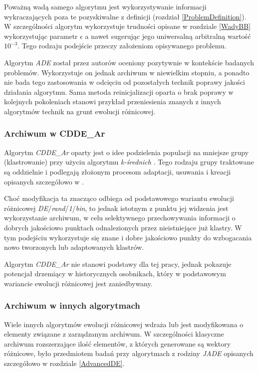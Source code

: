 \documentclass[12pt,a4paper]{report}
\begin{document}
{{{{\begin{description}
\end{description}
}
\par{
Poważną wadą samego algorytmu jest wykorzystywanie informacji wykraczających poza te pozyskiwalne z definicji (rozdział \ref{ProblemDefinition}). W szczególności algorytm wykorzystuje trudności opisane w rozdziale \ref{WadyBB} wykorzystując parametr $\epsilon$ a nawet sugerując jego uniwersalną arbitralną wartość $10^{-3}$. Tego rodzaju podejście przeczy założeniom opisywanego problemu.
}
\par{
Algorytm \emph{ADE} został przez autorów oceniony pozytywnie w kontekście badanych problemów. Wykorzystuje on jednak archiwum w niewielkim stopniu, a ponadto nie bada tego zastosowania w odcięciu od pozostałych technik poprawy jakości działania algorytmu. Sama metoda reinicjalizacji oparta o brak poprawy w kolejnych pokoleniach stanowi przykład przeniesienia znanych z innych algorytmów technik na grunt ewolucji różnicowej.
}

\subsubsection{Archiwum w CDDE{\_}Ar \cite{ClusterArchiveDE}}
\par{
Algorytm \emph{CDDE{\_}Ar} oparty jest o idee podzielenia populacji na mniejsze grupy (klastrowanie) przy użyciu algorytmu \emph{k-średnich} \cite{KMeans}. Tego rodzaju grupy traktowane są oddzielnie i podlegają złożonym procesom adaptacji, usuwania i kreacji opisanych szczegółowo w \cite{ClusterArchiveDE}.
}
\par{
Choć modyfikacja ta znacząco odbiega od podstawowego wariantu ewolucji różnicowej \emph{DE}/\emph{rand}/\emph{1}/\emph{bin}, to jednak istotnym z punktu jej widzenia jest wykorzystanie archiwum, w celu selektywnego przechowywania informacji o dobrych jakościowo punktach odnalezionych przez nieistniejące już klastry. W tym podejściu wykorzystuje się znane i dobre jakościowo punkty do wzbogacania nowo tworzonych lub adaptowanych klastrów.
}
\par{
Algorytm \emph{CDDE{\_}Ar} nie stanowi podstawy dla tej pracy, jednak pokazuje potencjał drzemiący w historycznych osobnikach, który w podstawowym wariancie ewolucji różnicowej jest zaniedbywany.
}

\subsubsection{Archiwum w innych algorytmach}
Wiele innych algorytmów ewolucji różnicowej wdraża lub jest modyfikowana o elementy związane z zarządzanym archiwum. W szczególności klasyczne archiwum rozszerzające ilość elementów, z których generowane są wektory różnicowe, było przedmiotem badań przy algorytmach z rodziny \emph{JADE} \cite{JADE, SHADE, JADE2} opisanych szczegółowo w rozdziale \ref{AdvancedDE}.

}}}
\end{document}

